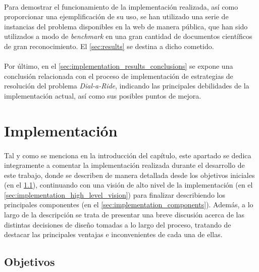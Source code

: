 \documentclass{subfiles}
\begin{document}
      \paragraph{}
      Para demostrar el funcionamiento de la implementación realizada, así como proporcionar una ejemplificación de su uso, se han utilizado una serie de instancias del problema disponibles en la web de manera pública, que han sido utilizados a modo de \emph{benchmark} en una gran cantidad de documentos científicos de gran reconocimiento. El \cref{sec:results} se destina a dicho cometido. 
      
      \paragraph{}
      Por último, en el \cref{sec:implementation_results_conclusions} se expone una conclusión relacionada con el proceso de implementación de estrategias de resolución del problema \emph{Dial-a-Ride}, indicando las principales debilidades de la implementación actual, así como sus posibles puntos de mejora.

    \section{Implementación}
    \label{sec:implementation}
      
      \paragraph{}
      Tal y como se menciona en la introducción del capítulo, este apartado se dedica integramente a comentar la implementación realizada durante el desarrollo de este trabajo, donde se describen de manera detallada desde los objetivos iniciales (en el \cref{sec:implementation_objectives}), continuando con una visión de alto nivel de la implementación (en el \cref{sec:implementation_high_level_vision}) para finalizar describiendo los principales componentes (en el \cref{sec:implementation_components}). Además, a lo largo de la descripción se trata de presentar una breve discusión acerca de las distintas decisiones de diseño tomadas a lo largo del proceso, tratando de destacar las principales ventajas e inconvenientes de cada una de ellas.

      \subsection{Objetivos}
      \label{sec:implementation_objectives}
\end{document}
